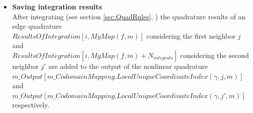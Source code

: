 \documentclass[BoSSSForSolvingConservationLaws.tex]{subfiles}
\begin{document}
\begin{itemize}
\begin{enumerate}
\end{enumerate}
\item \textbf{Saving integration results}\\
After integrating (see section \ref{sec:QuadRules}, ) the quadrature results of an edge quadrature \\$ResultsOfIntegration[i,MyMap(f,m)]$ considering the first neighbor $j$ and \\$ResultsOfIntegration[i,MyMap(f,m)+N_{integrals}]$ considering the second neighbor $j'$ are added to the output of the nonlinear quadrature \\$m\_Output[m\_CodomainMapping.LocalUniqueCoordinateIndex(\gamma, j, m)]$ and \\$m\_Output[m\_CodomainMapping.LocalUniqueCoordinateIndex(\gamma, j', m)]$ respectively.
\end{itemize}
\end{document}
